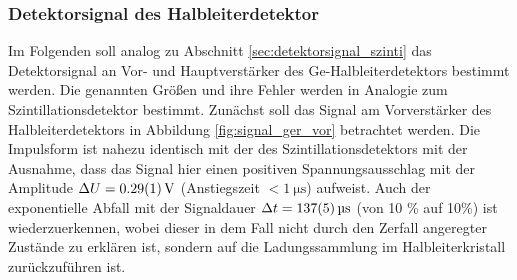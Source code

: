 \documentclass[11pt, a4paper]{article}
\numberwithin{equation}{section}
\begin{document}
\subsubsection{Detektorsignal des Halbleiterdetektor}
Im Folgenden soll analog zu Abschnitt \ref{sec:detektorsignal_szinti} das Detektorsignal an Vor- und Hauptverstärker des Ge-Halbleiterdetektors bestimmt werden.
Die genannten Größen und ihre Fehler werden in Analogie zum Szintillationsdetektor bestimmt.
Zunächst soll das Signal am Vorverstärker des Halbleiterdetektors in Abbildung \ref{fig:signal_ger_vor} betrachtet werden.
Die Impulsform ist nahezu identisch mit der des Szintillationsdetektors mit der Ausnahme, dass das Signal hier einen positiven Spannungsausschlag mit der Amplitude $\Delta U = \SI{0.29 +-0.01}{\volt}$ (Anstiegszeit $<\SI{1}{\micro\second}$) aufweist.
Auch der exponentielle Abfall mit der Signaldauer $\Delta t = \SI{137 +- 5}{\micro\second}$ (von 10 \% auf 10\%) ist wiederzuerkennen, wobei dieser in dem Fall nicht durch den Zerfall angeregter Zustände zu erklären ist, sondern auf die Ladungssammlung im Halbleiterkristall zurückzuführen ist.
\end{document}
